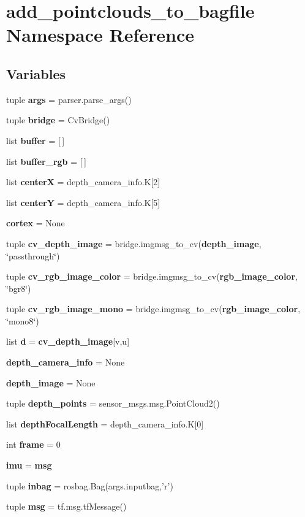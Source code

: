\section{add\-\_\-pointclouds\-\_\-to\-\_\-bagfile \-Namespace \-Reference}
\label{namespaceadd__pointclouds__to__bagfile}
\subsection*{\-Variables}
\begin{DoxyCompactItemize}
\item 
tuple {\bf args} = parser.\-parse\-\_\-args()
\item 
tuple {\bf bridge} = \-Cv\-Bridge()
\item 
list {\bf buffer} = [$\,$]
\item 
list {\bf buffer\-\_\-rgb} = [$\,$]
\item 
list {\bf center\-X} = depth\-\_\-camera\-\_\-info.\-K[2]
\item 
list {\bf center\-Y} = depth\-\_\-camera\-\_\-info.\-K[5]
\item 
{\bf cortex} = \-None
\item 
tuple {\bf cv\-\_\-depth\-\_\-image} = bridge.\-imgmsg\-\_\-to\-\_\-cv({\bf depth\-\_\-image}, \char`\"{}passthrough\char`\"{})
\item 
tuple {\bf cv\-\_\-rgb\-\_\-image\-\_\-color} = bridge.\-imgmsg\-\_\-to\-\_\-cv({\bf rgb\-\_\-image\-\_\-color}, \char`\"{}bgr8\char`\"{})
\item 
tuple {\bf cv\-\_\-rgb\-\_\-image\-\_\-mono} = bridge.\-imgmsg\-\_\-to\-\_\-cv({\bf rgb\-\_\-image\-\_\-color}, \char`\"{}mono8\char`\"{})
\item 
list {\bf d} = {\bf cv\-\_\-depth\-\_\-image}[v,u]
\item 
{\bf depth\-\_\-camera\-\_\-info} = \-None
\item 
{\bf depth\-\_\-image} = \-None
\item 
tuple {\bf depth\-\_\-points} = sensor\-\_\-msgs.\-msg.\-Point\-Cloud2()
\item 
list {\bf depth\-Focal\-Length} = depth\-\_\-camera\-\_\-info.\-K[0]
\item 
int {\bf frame} = 0
\item 
{\bf imu} = {\bf msg}
\item 
tuple {\bf inbag} = rosbag.\-Bag(args.\-inputbag,'r')
\item 
tuple {\bf msg} = tf.\-msg.\-tf\-Message()

\end{DoxyCompactItemize}

